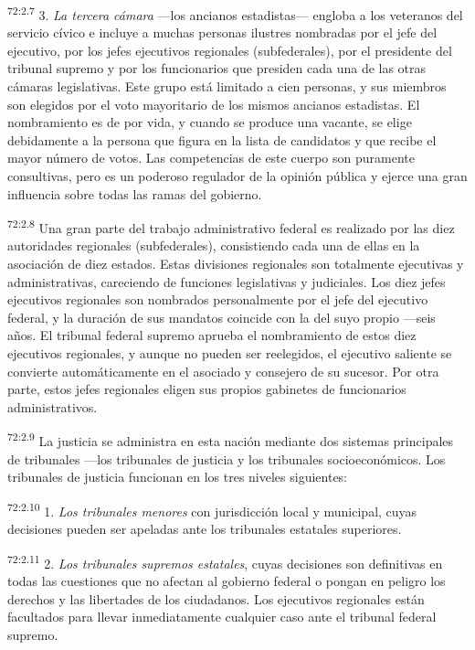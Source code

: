 \documentclass[twoside, 11pt]{book}
\begin{document}
\par
\textsuperscript{72:2.7} 3. \textit{La tercera cámara} ---los ancianos estadistas--- engloba a los veteranos del servicio cívico e incluye a muchas personas ilustres nombradas por el jefe del ejecutivo, por los jefes ejecutivos regionales (subfederales), por el presidente del tribunal supremo y por los funcionarios que presiden cada una de las otras cámaras legislativas. Este grupo está limitado a cien personas, y sus miembros son elegidos por el voto mayoritario de los mismos ancianos estadistas. El nombramiento es de por vida, y cuando se produce una vacante, se elige debidamente a la persona que figura en la lista de candidatos y que recibe el mayor número de votos. Las competencias de este cuerpo son puramente consultivas, pero es un poderoso regulador de la opinión pública y ejerce una gran influencia sobre todas las ramas del gobierno.

\par
\textsuperscript{72:2.8} Una gran parte del trabajo administrativo federal es realizado por las diez autoridades regionales (subfederales), consistiendo cada una de ellas en la asociación de diez estados. Estas divisiones regionales son totalmente ejecutivas y administrativas, careciendo de funciones legislativas y judiciales. Los diez jefes ejecutivos regionales son nombrados personalmente por el jefe del ejecutivo federal, y la duración de sus mandatos coincide con la del suyo propio ---seis años. El tribunal federal supremo aprueba el nombramiento de estos diez ejecutivos regionales, y aunque no pueden ser reelegidos, el ejecutivo saliente se convierte automáticamente en el asociado y consejero de su sucesor. Por otra parte, estos jefes regionales eligen sus propios gabinetes de funcionarios administrativos.

\par
\textsuperscript{72:2.9} La justicia se administra en esta nación mediante dos sistemas principales de tribunales ---los tribunales de justicia y los tribunales socioeconómicos. Los tribunales de justicia funcionan en los tres niveles siguientes:

\par
\textsuperscript{72:2.10} 1. \textit{Los tribunales menores} con jurisdicción local y municipal, cuyas decisiones pueden ser apeladas ante los tribunales estatales superiores.

\par
\textsuperscript{72:2.11} 2. \textit{Los tribunales supremos estatales}, cuyas decisiones son definitivas en todas las cuestiones que no afectan al gobierno federal o pongan en peligro los derechos y las libertades de los ciudadanos. Los ejecutivos regionales están facultados para llevar inmediatamente cualquier caso ante el tribunal federal supremo.
\end{document}
